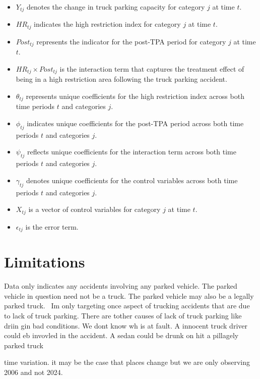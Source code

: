 \documentclass[
  12pt]{article}
\providecommand{\tightlist}{%
  \setlength{\itemsep}{0pt}\setlength{\parskip}{0pt}}\usepackage{longtable,booktabs,array}
\begin{document}
\begin{itemize}
\tightlist
\item
  \(Y_{tj}\) denotes the change in truck parking capacity for category
  \(j\) at time \(t\).
\item
  \(HR_{tj}\) indicates the high restriction index for category \(j\) at
  time \(t\).
\item
  \(Post_{tj}\) represents the indicator for the post-TPA period for
  category \(j\) at time \(t\).
\item
  \(HR_{tj} \times Post_{tj}\) is the interaction term that captures the
  treatment effect of being in a high restriction area following the
  truck parking accident.
\item
  \(\theta_{tj}\) represents unique coefficients for the high
  restriction index across both time periods \(t\) and categories \(j\).
\item
  \(\phi_{tj}\) indicates unique coefficients for the post-TPA period
  across both time periods \(t\) and categories \(j\).
\item
  \(\psi_{tj}\) reflects unique coefficients for the interaction term
  across both time periods \(t\) and categories \(j\).
\item
  \(\gamma_{tj}\) denotes unique coefficients for the control variables
  across both time periods \(t\) and categories \(j\).
\item
  \(X_{tj}\) is a vector of control variables for category \(j\) at time
  \(t\).
\item
  \(\epsilon_{tj}\) is the error term.
\end{itemize}

\section{\texorpdfstring{\textbf{Limitations}}{Limitations}}\label{limitations}

Data only indicates any accidents involving any parked vehicle. The
parked vehicle in question need not be a truck. The parked vehicle may
also be a legally parked truck.~ Im only targeting once aspect of
trucking accidents that are due to lack of truck parking. There are
tother causes of lack of truck parking like driin gin bad conditions. We
dont know wh is at fault. A innocent truck driver could eb invovled in
the accident. A sedan could be drunk on hit a pillagely parked truck

time variation. it may be the case that places change but we are only
observing 2006 and not 2024.
\end{document}
